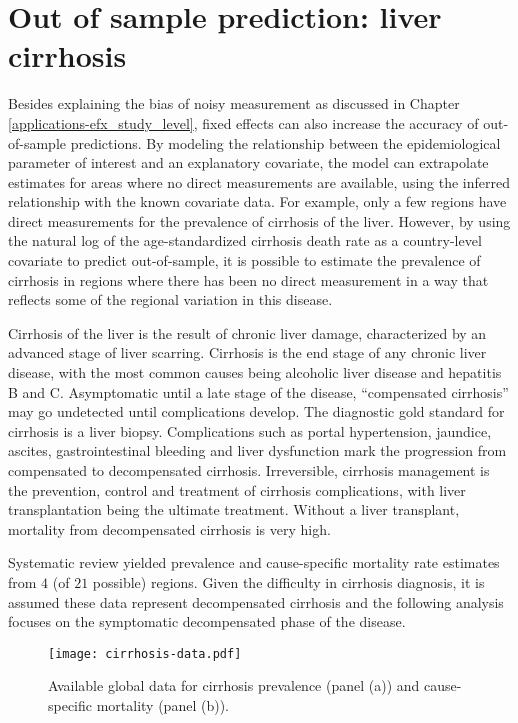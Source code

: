 \chapter{Out of sample prediction: liver cirrhosis}
\label{applications-efx_country_level}

Besides explaining the bias of noisy measurement as discussed in
Chapter \ref{applications-efx_study_level}, fixed effects can also
increase the accuracy of out-of-sample predictions.  By modeling the
relationship between the epidemiological parameter of interest and an
explanatory covariate, the model can extrapolate estimates for areas
where no direct measurements are available, using the inferred
relationship with the known covariate data.  For example, only a few
regions have direct measurements for the prevalence of cirrhosis of
the liver.  However, by using the natural log of the age-standardized
cirrhosis death rate as a country-level covariate to predict
out-of-sample, it is possible to estimate the prevalence of cirrhosis
in regions where there has been no direct measurement in a way that
reflects some of the regional variation in this disease.

Cirrhosis of the liver is the result of chronic liver damage,
characterized by an advanced stage of liver scarring.  Cirrhosis is
the end stage of any chronic liver disease, with the most common
causes being alcoholic liver disease and hepatitis B and C.
Asymptomatic until a late stage of the disease, ``compensated
cirrhosis'' may go undetected until complications develop.  The
diagnostic gold standard for cirrhosis is a liver biopsy.
Complications such as portal hypertension, jaundice, ascites,
gastrointestinal bleeding and liver dysfunction mark the progression
from compensated to decompensated cirrhosis.  Irreversible, cirrhosis
management is the prevention, control and treatment of cirrhosis
complications, with liver transplantation being the ultimate
treatment.  Without a liver transplant, mortality from decompensated
cirrhosis is very high. \cite{garcia-tsao_management_2009,
  damico_natural_2006, schuppan_liver_2008}

Systematic review yielded prevalence and cause-specific mortality rate
estimates from $4$ (of $21$ possible) regions.  Given the difficulty in
cirrhosis diagnosis, it is assumed these data represent decompensated
cirrhosis and the following analysis focuses on the symptomatic
decompensated phase of the disease.

    \begin{figure}[h]
        \begin{center}
            \texttt{[image: cirrhosis-data.pdf]}
            \caption{Available global data for cirrhosis prevalence
              (panel (a)) and cause-specific mortality (panel (b)).}
            \label{fig:app-cirrhosis data}
        \end{center}
    \end{figure}

